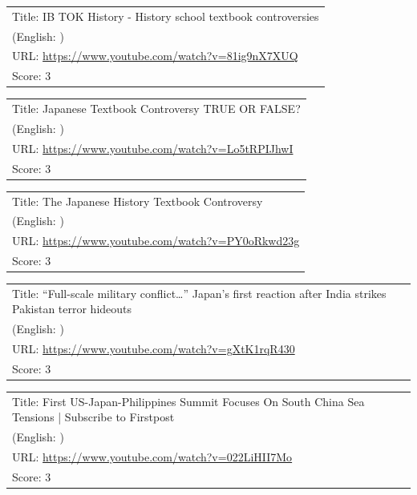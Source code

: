 \documentclass{article}
\begin{document}
\noindent
\begin{tabular}{p{}}
Title: IB TOK History - History school textbook controversies \\
(English: ) \\
URL: \url{https://www.youtube.com/watch?v=81ig9nX7XUQ} \\
Score: 3 \\
\end{tabular}
\vspace{0.5em}

\noindent
\begin{tabular}{p{}}
Title: Japanese Textbook Controversy TRUE OR FALSE? \\
(English: ) \\
URL: \url{https://www.youtube.com/watch?v=Lo5tRPIJhwI} \\
Score: 3 \\
\end{tabular}
\vspace{0.5em}

\noindent
\begin{tabular}{p{}}
Title: The Japanese History Textbook Controversy \\
(English: ) \\
URL: \url{https://www.youtube.com/watch?v=PY0oRkwd23g} \\
Score: 3 \\
\end{tabular}
\vspace{0.5em}

\noindent
\begin{tabular}{p{}}
Title: “Full-scale military conflict…” Japan’s first reaction after India strikes Pakistan terror hideouts \\
(English: ) \\
URL: \url{https://www.youtube.com/watch?v=gXtK1rqR430} \\
Score: 3 \\
\end{tabular}
\vspace{0.5em}

\noindent
\begin{tabular}{p{}}
Title: First US-Japan-Philippines Summit Focuses On South China Sea Tensions | Subscribe to Firstpost \\
(English: ) \\
URL: \url{https://www.youtube.com/watch?v=022LiHII7Mo} \\
Score: 3 \\
\end{tabular}
\vspace{0.5em}
\end{document}
